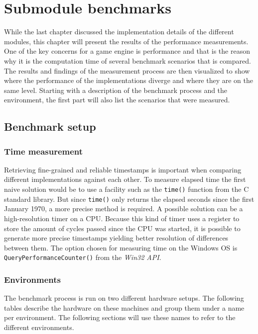 \chapter{Submodule benchmarks}

While the last chapter discussed the implementation details of the different modules, this chapter will present the results of the performance measurements. One of the key concerns for a game engine is performance and that is the reason why it is the computation time of several benchmark scenarios that is compared. The results and findings of the measurement process are then visualized to show where the performance of the implementations diverge and where they are on the same level. Starting with a description of the benchmark process and the environment, the first part will also list the scenarios that were measured. 

\section{Benchmark setup}

\subsection{Time measurement}

Retrieving fine-grained and reliable timestamps is important when comparing different implementations against each other. To measure elapsed time the first naive solution would be to use a facility such as the \texttt{time()} function from the C standard library. But since \texttt{time()} only returns the elapsed seconds since the first January 1970, a more precise method is required. A possible solution can be a high-resolution timer on a CPU. Because this kind of timer uses a register to store the amount of cycles passed since the CPU was started, it is possible to generate more precise timestamps yielding better resolution of differences between them. The option chosen for measuring time on the Windows \ac{OS} is \texttt{QueryPerformanceCounter()} from the \textit{Win32 \ac{API}}.

\subsection{Environments}

The benchmark process is run on two different hardware setups. The following tables describe the hardware on these machines and group them under a name per environment. The following sections will use these names to refer to the different environments.

